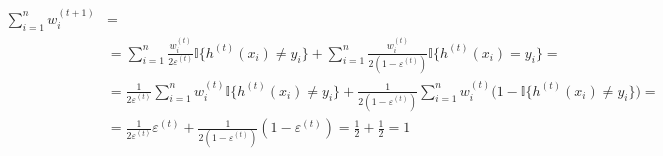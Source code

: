 \begin{equation*}
\begin{split}
	\sum_{i=1}^{n}w_{i}^{(t+1)} & = \\
	& = \sum_{i=1}^{n}\frac{w_{i}^{(t)}}{2\varepsilon^{(t)}}\mathbb{I}
		\lbrace 
			h^{(t)}(x_{i}) \neq y_{i}
		\rbrace 
	+
	\sum_{i=1}^{n}\frac{w_{i}^{(t)}}{2(1-\varepsilon^{(t)})}\mathbb{I}
	\lbrace
		h^{(t)}(x_{i}) = y_{i}
	\rbrace = \\ 
	& = \frac{1}{2\varepsilon^{(t)}}\sum_{i=1}^{n}w_{i}^{(t)}\mathbb{I}
	\lbrace 
		h^{(t)}(x_{i}) \neq y_{i} 
	\rbrace 
	+ 
	\frac{1}{2(1-\varepsilon^{(t)})}\sum_{i=1}^{n}w_{i}^{(t)}
	\big(
		1-\mathbb{I} \lbrace
			{h^{(t)}}(x_{i}) \neq y_{i}
		\rbrace
	\big) = \\ 
	& = \frac{1}{2\varepsilon^{(t)}}\varepsilon^{(t)}+\frac{1}{2(1-\varepsilon^{(t)})}
	(
		1-\varepsilon^{(t)}
	) =
	\frac{1}{2} + \frac{1}{2} = 1
\end{split}
\end{equation*}






